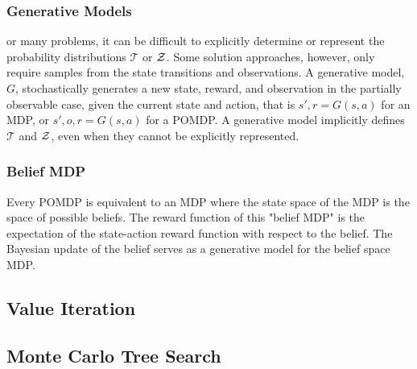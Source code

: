 
\subsubsection{Generative Models}

or many problems, it can be difficult to explicitly determine or represent the probability distributions $\mathcal{T}$ or $\mathcal{Z}$.
Some solution approaches, however, only require samples from the state transitions and observations.
A generative model, $G$, stochastically generates a new state, reward, and observation in the partially observable case, given the current state and action, that is $s', r = G(s,a)$ for an MDP, or $s', o, r = G(s, a)$ for a POMDP.
A generative model implicitly defines $\mathcal{T}$ and $\mathcal{Z}$, even when they cannot be explicitly represented.

\subsubsection{Belief MDP}

Every POMDP is equivalent to an MDP where the state space of the MDP is the space of possible beliefs.
The reward function of this "belief MDP" is the expectation of the state-action reward function with respect to the belief.
The Bayesian update of the belief serves as a generative model for the belief space MDP.

\subsection{Value Iteration}

\subsection{Monte Carlo Tree Search} \label{sec:mcts}

